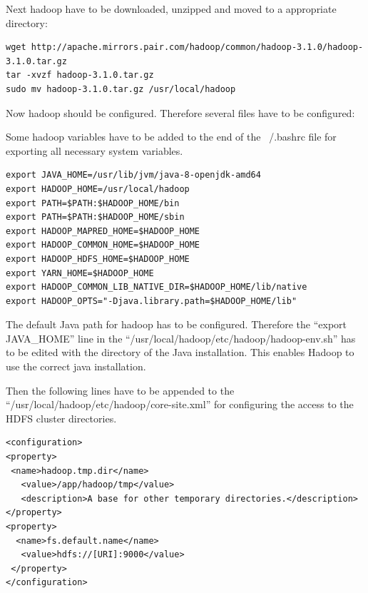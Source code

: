 Next hadoop have to be downloaded, unzipped and moved to a appropriate directory:
\begin{lstlisting}[caption={HDFS installation},captionpos=b]
wget http://apache.mirrors.pair.com/hadoop/common/hadoop-3.1.0/hadoop-3.1.0.tar.gz
tar -xvzf hadoop-3.1.0.tar.gz
sudo mv hadoop-3.1.0.tar.gz /usr/local/hadoop
\end{lstlisting}

Now hadoop should be configured. Therefore several files have to be configured:

Some hadoop variables have to be added to the end of the ~/.bashrc file for exporting all necessary system variables. 
\begin{lstlisting}[caption={Hadoop variables for ~/.bashrc},captionpos=b]
export JAVA_HOME=/usr/lib/jvm/java-8-openjdk-amd64
export HADOOP_HOME=/usr/local/hadoop
export PATH=$PATH:$HADOOP_HOME/bin
export PATH=$PATH:$HADOOP_HOME/sbin
export HADOOP_MAPRED_HOME=$HADOOP_HOME
export HADOOP_COMMON_HOME=$HADOOP_HOME
export HADOOP_HDFS_HOME=$HADOOP_HOME
export YARN_HOME=$HADOOP_HOME
export HADOOP_COMMON_LIB_NATIVE_DIR=$HADOOP_HOME/lib/native
export HADOOP_OPTS="-Djava.library.path=$HADOOP_HOME/lib"
\end{lstlisting}

The default Java path for hadoop has to be configured. Therefore the ``export JAVA\_HOME'' line in the ``/usr/local/hadoop/etc/hadoop/hadoop-env.sh'' has to be edited with the directory of the Java installation. This enables Hadoop to use the correct java installation.

Then the following lines have to be appended to the ``/usr/local/hadoop/etc/hadoop/core-site.xml'' for configuring the access to the HDFS cluster directories.
\begin{lstlisting}[caption={Configurations core-site.xml},captionpos=b]
<configuration>
<property>
 <name>hadoop.tmp.dir</name>
   <value>/app/hadoop/tmp</value>
   <description>A base for other temporary directories.</description>
</property>
<property>
  <name>fs.default.name</name>
   <value>hdfs://[URI]:9000</value>
 </property>
</configuration>
\end{lstlisting}


